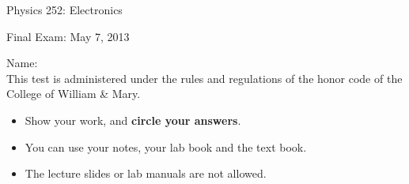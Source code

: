 \documentclass[letterpaper,addpoints,answers]{exam}
\begin{document}
\begin{coverpages}
 \large\bfseries
 
 \noindent 
 Physics 252: Electronics
 
 \vspace{2ex}
 \noindent
 Final Exam: May 7, 2013

 \vspace{5ex}
 \noindent 
 Name:\enspace\makebox[2in]{\hrulefill}\\

 \vspace{5ex}
 \noindent 
 This test is administered under the rules and regulations of the honor 
 code of the College of William \& Mary.  

 \vspace{5ex}
 \noindent 
 \begin{itemize}
  \item Show your work, and \textbf{circle your answers}.
  \item You can use your notes, your lab book and the text book.
  \item The lecture slides or lab manuals are not allowed.
 \end{itemize}

 \vspace{5ex}
 \begin{center}
  \gradetable[v][questions]
 \end{center}
\end{coverpages}
 
\end{document}
